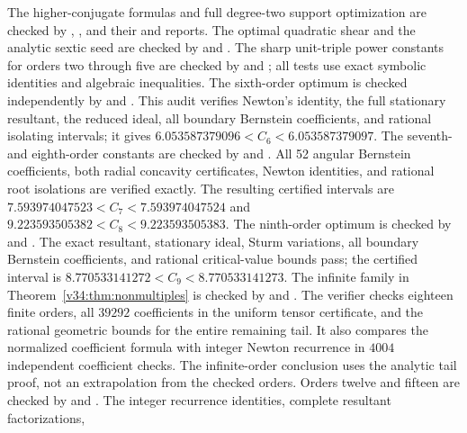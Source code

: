 \documentclass[UTF8,11pt]{ctexart}
\theoremstyle{definition}
\numberwithin{equation}{section}
\begin{document}
\begingroup\raggedright
The higher-conjugate formulas and full degree-two support
optimization are checked by
,
, and their
 and
 reports.
The optimal quadratic shear and the analytic sextic seed are
checked by  and
.
The sharp unit-triple power constants for orders two through five
are checked by  and
; all tests use
exact symbolic identities and algebraic inequalities.
The sixth-order optimum is checked independently by
 and
. This audit verifies
Newton's identity, the full stationary resultant, the reduced ideal,
all boundary Bernstein coefficients, and rational isolating intervals;
it gives $6.053587379096<C_6<6.053587379097$.
The seventh- and eighth-order constants are checked by
 and
.
All 52 angular Bernstein coefficients, both radial concavity
certificates, Newton identities, and rational root isolations are
verified exactly. The resulting certified intervals are
$7.593974047523<C_7<7.593974047524$ and
$9.223593505382<C_8<9.223593505383$.
The ninth-order optimum is checked by
 and
. The exact resultant,
stationary ideal, Sturm variations, all boundary Bernstein coefficients,
and rational critical-value bounds pass; the certified interval is
$8.770533141272<C_9<8.770533141273$.
The infinite family in Theorem~\ref{v34:thm:nonmultiples} is checked by
 and
. The verifier
checks eighteen finite orders, all $39292$ coefficients in the uniform
tensor certificate, and the rational geometric bounds for the entire
remaining tail. It also compares the normalized coefficient formula
with integer Newton recurrence in $4004$ independent coefficient checks.
The infinite-order conclusion uses the analytic tail proof, not an
extrapolation from the checked orders.
Orders twelve and fifteen are checked by
 and
.
The integer recurrence identities, complete resultant factorizations,
\end{document}

